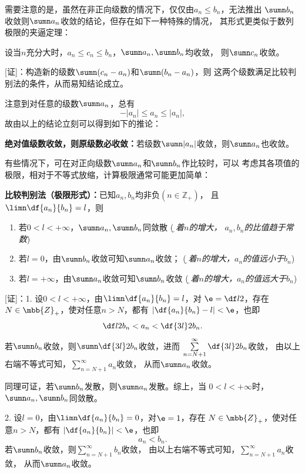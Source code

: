 需要注意的是，虽然在非正向级数的情况下，仅仅由$a_n\leq b_n$，无法推出
$\sumn b_n$收敛则$\sumn a_n$收敛的结论，但存在如下一种特殊的情况，
其形式更类似于数列极限的夹逼定理：

\begin{thx}
	设当$n$充分大时，$a_n\leq c_n\leq b_n$，$\sumn a_n,\sumn
	b_n$均收敛， 则$\sumn c_n$收敛。
\end{thx}

[证]：构造新的级数$\sumn(c_n-a_n)$和$\sumn(b_n-a_n)$，则
这两个级数满足比较判别法的条件，从而易知结论成立。\fin

注意到对任意的级数$\sumn a_n$，总有
$$-|a_n|\leq a_n\leq |a_n|,$$
故由以上的结论立刻可以得到如下的推论：

\begin{thx}
	{\bf 绝对值级数收敛，则原级数必收敛：}若级数$\sumn|a_n|$收敛，则$\sumn a_n$也收敛。
\end{thx}

有些情况下，可在对正向级数$\sumn a_n$和$\sumn b_n$作比较时，可以
考虑其各项值的极限，相对于不等式放缩，计算极限通常可能更加简单：

\begin{thx}
	{\bf 比较判别法（极限形式）：}已知$a_n,b_n$均非负$(n\in\mathbb{Z}_+)$，
	且$\limn\df{a_n}{b_n}=l$，则 
	\begin{enumerate}
	  \item 若$0<l<+\infty$，$\sumn a_n,\sumn b_n$同敛散 \hfill({\it\b 随着$n$的增大，
	  $a_n,b_n$的比值趋于常数})
	  \item 若$l=0$，由$\sumn b_n$收敛可知$\sumn a_n$收敛； 
	  \hfill({\it\b 随着$n$的增大，$a_n$的值远小于$b_n$})
	  \item 若$l=+\infty$，由$\sumn a_n$收敛可知$\sumn b_n$收敛
	  \hfill({\it\b 随着$n$的增大，$a_n$的值远大于$b_n$})
	\end{enumerate}
\end{thx}

[证]：1. 设$0<l<+\infty$，由$\limn\df{a_n}{b_n}=l$，对
$\e=\df l2$，存在$N\in\mbb{Z}_+$，使对任意$n>N$，都有
$\left|\df{a_n}{b_n}-l\right|<\e$，也即
$$\df l2b_n<a_n<\df{3l}2b_n.$$
若$\sumn b_n$收敛，则$\sumn\df{3l}2b_n$收敛，进而
$\sum\limits_{n=N+1}^{\infty}\df{3l}2b_n$收敛，
由以上右端不等式可知，$\sum\limits_{n=N+1}^{\infty}a_n$收敛，
从而$\sumn a_n$收敛。

同理可证，若$\sumn b_n$发散，则$\sumn a_n$发散。综上，当
$0<l<+\infty$时，$\sumn a_n,\sumn b_n$同敛散。

2. 设$l=0$，由$\limn\df{a_n}{b_n}=0$，对$\e=1$，存在
$N\in\mbb{Z}_+$，使对任意$n>N$，都有
$\left|\df{a_n}{b_n}\right|<\e$，也即
$$a_n<b_n.$$
若$\sumn b_n$收敛，则$\sum\limits_{n=N+1}^{\infty}b_n$收敛，
由以上右端不等式可知，$\sum\limits_{n=N+1}^{\infty}a_n$收敛，
从而$\sumn a_n$收敛。

